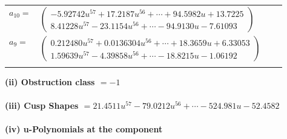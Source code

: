 \documentclass[1p]{elsarticle_modified}
\theoremstyle{definition}
\begin{document}
\begin{tabular}{m{7pt} m{180pt} m{7pt} m{180pt} }
\flushright $a_{10}=$&$\begin{pmatrix}-5.92742 u^{57}+17.2187 u^{56}+\cdots+94.5982 u+13.7225\\8.41228 u^{57}-23.1154 u^{56}+\cdots-94.9130 u-7.61093\end{pmatrix}$ \\
\flushright $a_{9}=$&$\begin{pmatrix}0.212480 u^{57}+0.0136304 u^{56}+\cdots+18.3659 u+6.33053\\1.59639 u^{57}-4.39858 u^{56}+\cdots-18.8215 u-1.06192\end{pmatrix}$\\&\end{tabular}
\flushleft \textbf{(ii) Obstruction class $= -1$}\\~\\
\flushleft \textbf{(iii) Cusp Shapes $= 21.4511 u^{57}-79.0212 u^{56}+\cdots-524.981 u-52.4582$}\\~\\
\newpage\renewcommand{\arraystretch}{1}
\flushleft \textbf{(iv) u-Polynomials at the component}\newline \\
\end{document}
